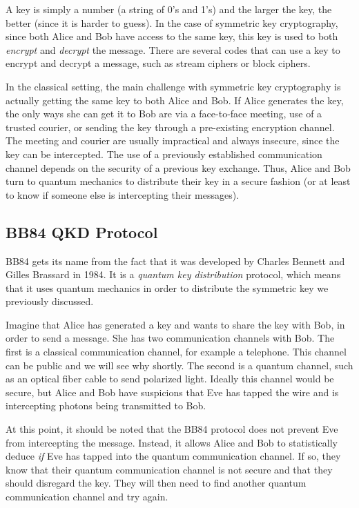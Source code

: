 \documentclass[11pt]{article} %
\begin{document}
A key is simply a number (a string of 0's and 1's) and the larger the key, the better (since it is harder to guess). In the case of symmetric key cryptography, since both Alice and Bob have access to the same key, this key is used to both \textit{encrypt} and \textit{decrypt} the message. There are several codes that can use a key to encrypt and decrypt a message, such as stream ciphers or block ciphers. 

In the classical setting, the main challenge with symmetric key cryptography is actually getting the same key to both Alice and Bob. If Alice generates the key, the only ways she can get it to Bob are via a face-to-face meeting, use of a trusted courier, or sending the key through a pre-existing encryption channel. The meeting and courier are usually impractical and always insecure, since the key can be intercepted. The use of a previously established communication channel depends on the security of a previous key exchange. Thus, Alice and Bob turn to quantum mechanics to distribute their key in a secure fashion (or at least to know if someone else is intercepting their messages).

\subsection{BB84 QKD Protocol}

BB84 gets its name from the fact that it was developed by Charles Bennett and Gilles Brassard in 1984. It is a \textit{quantum key distribution} protocol, which means that it uses quantum mechanics in order to distribute the symmetric key we previously discussed.

Imagine that Alice has generated a key and wants to share the key with Bob, in order to send a message. She has two communication channels with Bob. The first is a classical communication channel, for example a telephone. This channel can be public and we will see why shortly. The second is a quantum channel, such as an optical fiber cable to send polarized light. Ideally this channel would be secure, but Alice and Bob have suspicions that Eve has tapped the wire and is intercepting photons being transmitted to Bob. 

At this point, it should be noted that the BB84 protocol does not prevent Eve from intercepting the message. Instead, it allows Alice and Bob to statistically deduce \textit{if} Eve has tapped into the quantum communication channel. If so, they know that their quantum communication channel is not secure and that they should disregard the key. They will then need to find another quantum communication channel and try again.
\end{document}
